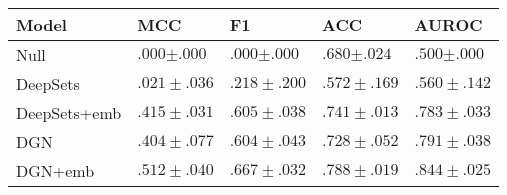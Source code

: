 \begin{tabular}{lllll}
\toprule
Model & \textbf{MCC} & \textbf{F1} & \textbf{ACC} & \textbf{AUROC} \\
\midrule
Null & $.000{\scriptstyle \pm .000}$ & $.000{\scriptstyle \pm .000}$ & $.680{\scriptstyle \pm .024}$ & $.500{\scriptstyle \pm .000}$ \\
DeepSets & $.021\scriptstyle \pm .036$ & $.218\scriptstyle \pm .200$ & $.572\scriptstyle \pm .169$ & $.560\scriptstyle \pm .142$ \\
DeepSets+emb & $.415\scriptstyle \pm .031$ & $.605\scriptstyle \pm .038$ & $.741\scriptstyle \pm .013$ & $.783\scriptstyle \pm .033$ \\
DGN & $.404\scriptstyle \pm .077$ & $.604\scriptstyle \pm .043$ & $.728\scriptstyle \pm .052$ & $.791\scriptstyle \pm .038$ \\
DGN+emb & $\mathbf{.512\scriptstyle \pm .040}$ & $\mathbf{.667\scriptstyle \pm .032}$ & $\mathbf{.788\scriptstyle \pm .019}$ & $\mathbf{.844\scriptstyle \pm .025}$ \\
\bottomrule
\end{tabular}
